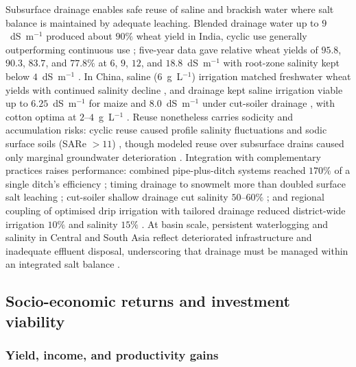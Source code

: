 \documentclass[11pt]{article}
\begin{document}
Subsurface drainage enables safe reuse of saline and brackish water where salt
balance is maintained by adequate leaching. Blended drainage water up to
$9$~dS~m$^{-1}$ produced about $90\%$ wheat yield in India, cyclic use generally
outperforming continuous use \parencite{Sharma2004}; five-year data gave relative
wheat yields of $95.8$, $90.3$, $83.7$, and $77.8\%$ at $6$, $9$, $12$, and
$18.8$~dS~m$^{-1}$ with root-zone salinity kept below $4$~dS~m$^{-1}$
\parencite{Sharma1998}. In China, saline ($6$~g~L$^{-1}$)
irrigation matched freshwater wheat yields with continued salinity decline
\parencite{Gao2023}, and drainage kept saline irrigation viable up to
$6.25$~dS~m$^{-1}$ for maize \parencite{Feng2017} and $8.0$~dS~m$^{-1}$
under cut-soiler drainage \parencite{Neha2022}, with cotton optima at
$2$--$4$~g~L$^{-1}$ \parencite{Li2024,Lu2019}. Reuse nonetheless carries sodicity
and accumulation risks: cyclic reuse caused profile salinity fluctuations and
sodic surface soils (SARe $>11$) \parencite{Mitchell2000,Jayawardane2001},
though modeled reuse over subsurface drains caused only marginal groundwater
deterioration \parencite{KARAJEH1994c}. Integration with complementary practices
raises performance: combined pipe-plus-ditch systems reached $170\%$ of a single
ditch's efficiency \parencite{Yao2024}; timing drainage to snowmelt more than
doubled surface salt leaching \parencite{Yu2016}; cut-soiler shallow drainage cut
salinity $50$--$60\%$ \parencite{Neha2022,Neha2022b}; and regional coupling of
optimised drip irrigation with tailored drainage reduced district-wide irrigation
$10\%$ and salinity $15\%$ \parencite{Liu2026}. At basin scale, persistent
waterlogging and salinity in Central and South Asia reflect deteriorated
infrastructure and inadequate effluent disposal, underscoring that drainage must
be managed within an integrated salt balance
\parencite{Dukhovny2007,Qureshi2008,Ritzema2016}.

\subsection{Socio-economic returns and investment viability}

\subsubsection{Yield, income, and productivity gains}
\end{document}
